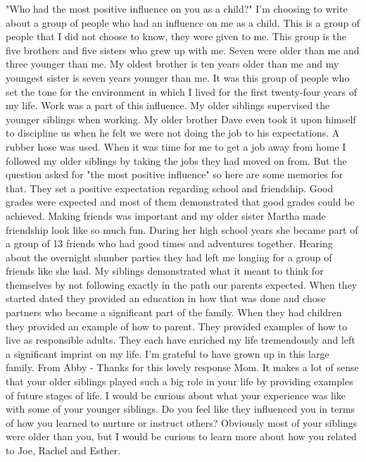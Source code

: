 "Who had the most positive influence on you as a child?"
I'm choosing to write about a group of people who had an influence on me as a child. This is a group of people that I did not choose to know, they were given to me. This group is the five brothers and five sisters who grew up with me. Seven were older than me and three younger than me. My oldest brother is ten years older than me and my youngest sister is seven years younger than me. It was this group of people who set the tone for the environment in which I lived for the first twenty-four years of my life. Work was a part of this influence. My older siblings supervised the younger siblings when working. My older brother Dave even took it upon himself to discipline us when he felt we were not doing the job to his expectations. A rubber hose was used. When it was time for me to get a job away from home I followed my older siblings by taking the jobs they had moved on from.
But the question asked for "the most positive influence" so here are some memories for that. They set a positive expectation regarding school and friendship. Good grades were expected and most of them demonstrated that good grades could be achieved. Making friends was important and my older sister Martha made friendship look like so much fun. During her high school years she became part of a group of 13 friends who had good times and adventures together. Hearing about the overnight slumber parties they had left me longing for a group of friends like she had. 
My siblings demonstrated what it meant to think for themselves by not following exactly in the path our parents expected. When they started dated they provided an education in how that was done and chose partners who became a significant part of the family. When they had children they provided an example of how to parent. They provided examples of how to live as responsible adults. They each have enriched my life tremendously and left a significant imprint on my life. I'm grateful to have grown up in this large family.
From Abby - Thanks for this lovely response Mom. It makes a lot of sense that your older siblings played such a big role in your life by providing examples of future stages of life. I would be curious about what your experience was like with some of your younger siblings. Do you feel like they influenced you in terms of how you learned to nurture or instruct others? Obviously most of your siblings were older than you, but I would be curious to learn more about how you related to Joe, Rachel and Esther.
